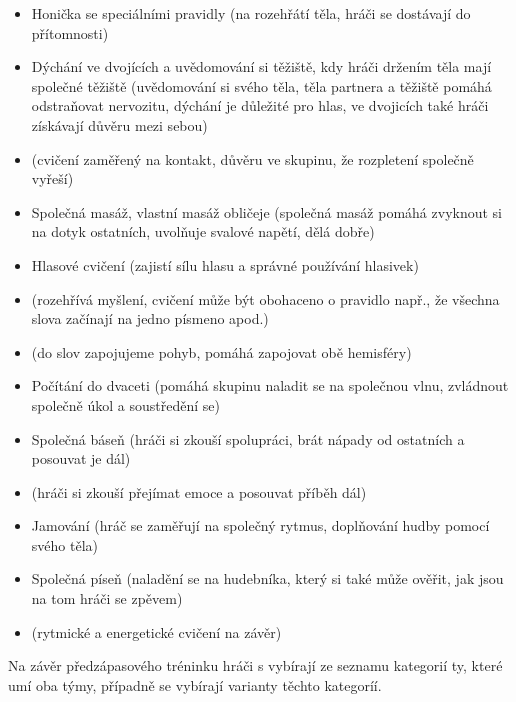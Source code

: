 \begin{itemize}
\item Honička se speciálními pravidly (na rozehřátí těla, hráči se dostávají do přítomnosti)
\item Dýchání ve dvojících a uvědomování si těžiště, kdy hráči držením těla mají společné těžiště (uvědomování si svého těla, těla partnera a těžiště pomáhá odstraňovat nervozitu, dýchání je důležité pro hlas, ve dvojicích také hráči získávají důvěru mezi sebou)
\item {} (cvičení zaměřený na kontakt, důvěru ve skupinu, že rozpletení společně vyřeší)
\item Společná masáž, vlastní masáž obličeje (společná masáž pomáhá zvyknout si na dotyk ostatních, uvolňuje svalové napětí, dělá dobře)
\item Hlasové cvičení (zajistí sílu hlasu a správné používání hlasivek)
\item {} (rozehřívá myšlení, cvičení může být obohaceno o pravidlo např., že všechna slova začínají na jedno písmeno apod.)
\item {} (do slov zapojujeme pohyb, pomáhá zapojovat obě hemisféry)
\item Počítání do dvaceti (pomáhá skupinu naladit se na společnou vlnu, zvládnout společně úkol a soustředění se)
\item Společná báseň (hráči si zkouší spolupráci, brát nápady od ostatních a posouvat je dál)
\item {} (hráči si zkouší přejímat emoce a posouvat příběh dál)
\item Jamování (hráč se zaměřují na společný rytmus, doplňování hudby pomocí svého těla)
\item Společná píseň (naladění se na hudebníka, který si také může ověřit, jak jsou na tom hráči se zpěvem)
\item {} (rytmické a energetické cvičení na závěr)
\end{itemize}
 
Na závěr předzápasového tréninku hráči s  vybírají ze seznamu kategorií ty, které umí oba týmy, případně se vybírají varianty těchto kategoríí. 
 
 
